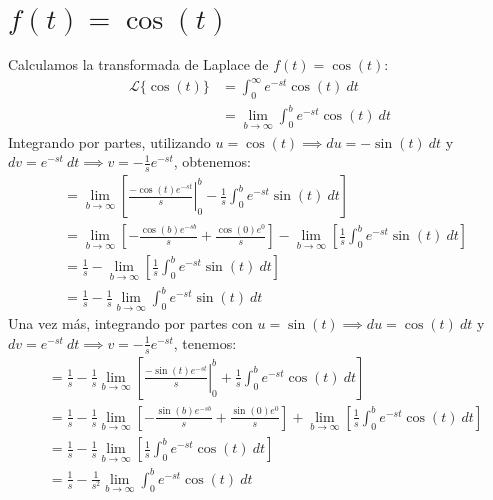 \documentclass[12pt, a4paper]{article}
\begin{document}
\sffamily


\newpage

\setcounter{section}{7}
\section{\texorpdfstring{\(f(t)=\cos(t)\)}{f (t) = cos (t)}}

Calculamos la transformada de Laplace de \(f(t) = \cos(t)\):
\begin{align*}
	\mathcal{L}\{\cos (t)\} &= \int_{0}^{\infty} e^{-st} \cos(t)\ dt \\
	&= \lim_{b \to \infty} \int_{0}^{b} e^{-st} \cos(t)\ dt
\end{align*}
Integrando por partes, utilizando \(u = \cos(t) \implies du = -\sin(t)\ dt\) y \(dv = e^{-st}\ dt \implies v = -\frac{1}{s} e^{-st}\), obtenemos:
\begin{align*}
	&= \lim_{b \to \infty} \left[ \left. \frac{-\cos (t) e^{-st}}{s} \right|_{0}^{b} - \frac{1}{s} \int_{0}^{b} e^{-st} \sin (t) \ dt \right] \\
	&= \lim_{b \to \infty} \left[ - \frac{\cos (b) e^{-sb}}{s} + \frac{\cos (0) e^{0}}{s} \right] - \lim_{b \to \infty} \left[ \frac{1}{s} \int_{0}^{b} e^{-st} \sin (t) \ dt \right] \\
	&= \frac{1}{s} - \lim_{b \to \infty} \left[ \frac{1}{s} \int_{0}^{b} e^{-st} \sin (t) \ dt \right] \\
	&= \frac{1}{s} - \frac{1}{s} \lim_{b \to \infty} \int_{0}^{b} e^{-st} \sin (t) \ dt
\end{align*}
Una vez más, integrando por partes con \(u = \sin (t) \implies du = \cos (t)\ dt\) y \(dv = e^{-st}\ dt \implies v = -\frac{1}{s} e^{-st}\), tenemos:
\begin{align*}
	&= \frac{1}{s} - \frac{1}{s} \lim_{b \to \infty} \left[ \left. \frac{-\sin (t) e^{-st}}{s} \right|_{0}^{b} + \frac{1}{s} \int_{0}^{b} e^{-st} \cos (t)\ dt \right] \\
	&= \frac{1}{s} - \frac{1}{s} \lim_{b \to \infty} \left[ - \frac{\sin (b) e^{-sb}}{s} + \frac{\sin (0) e^{0}}{s} \right] + \lim_{b \to \infty} \left[ \frac{1}{s} \int_{0}^{b} e^{-st} \cos (t)\ dt \right] \\
	&= \frac{1}{s} - \frac{1}{s} \lim_{b \to \infty} \left[ \frac{1}{s} \int_{0}^{b} e^{-st} \cos (t)\ dt \right] \\
	&= \frac{1}{s} - \frac{1}{s^{2}} \lim_{b \to \infty} \int_{0}^{b} e^{-st} \cos (t) \ dt
\end{align*}
\end{document}
